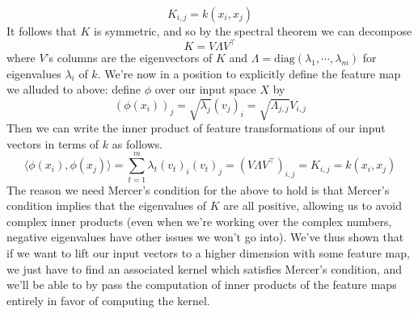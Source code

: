 $$ K_{i, j} = k(x_i, x_j) $$
It follows that $ K $ is symmetric, and so by the spectral theorem we can decompose
$$ K = V \Lambda V^\intercal $$
where $ V $'s columns are the eigenvectors of $ K $ and $ \Lambda = \text{diag}(\lambda_1, \cdots, \lambda_m) $ for eigenvalues $ \lambda_i $ of $ k $. We're now in a position to explicitly define the feature map we alluded to above: define $ \phi $ over our input space $ X $ by
$$ (\phi(x_i))_j = \sqrt{\lambda_j} (v_j)_i = \sqrt{\Lambda_{j, j}} V_{i, j} $$
Then we can write the inner product of feature transformations of our input vectors in terms of $ k $ as follows.
$$ \langle \phi(x_i), \phi(x_j) \rangle = \sum_{t = 1}^m \lambda_t (v_t)_i (v_t)_j = (V \Lambda V^\intercal)_{i, j} = K_{i, j} = k(x_i, x_j) $$
The reason we need Mercer's condition for the above to hold is that Mercer's condition implies that the eigenvalues of $ K $ are all positive, allowing us to avoid complex inner products (even when we're working over the complex numbers, negative eigenvalues have other issues we won't go into).
\newline \newline
We've thus shown that if we want to lift our input vectors to a higher dimension with some feature map, we just have to find an associated kernel which satisfies Mercer's condition, and we'll be able to by pass the computation of inner products of the feature maps entirely in favor of computing the kernel.


